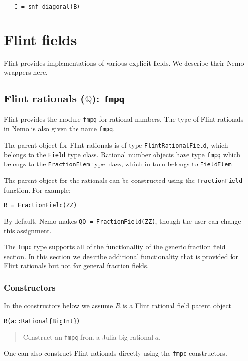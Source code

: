 \documentclass[a4paper,10pt]{article}
\newcommand{\Q}{\mathbb{Q}}
\newcommand{\code}{\lstinline}
\newcommand{\desc}[1]{\vspace{-3mm}\begin{quote}#1\end{quote}}
\begin{document}
{{\begin{lstlisting}
   C = snf_diagonal(B)
\end{lstlisting}

\section{Flint fields}

Flint provides implementations of various explicit fields. We describe their
Nemo wrappers here.

\subsection{Flint rationals ($\Q$): \code|fmpq|}

Flint provides the module \code{fmpq} for rational numbers. The type of Flint rationals
in Nemo is also given the name \code{fmpq}.

The parent object for Flint rationals is of type \code{FlintRationalField}, which
belongs to the \code{Field} type class. Rational number objects have type \code{fmpq}
which belongs to the \code{FractionElem} type class, which in turn belongs to 
\code{FieldElem}.

The parent object for the rationals can be constructed using the \code{FractionField}
function. For example:

\begin{lstlisting}
R = FractionField(ZZ)
\end{lstlisting}

By default, Nemo makes \code{QQ = FractionField(ZZ)}, though the user can change this
assignment.

The \code{fmpq} type supports all of the functionality of the generic fraction field
section. In this section we describe additional functionality that is provided for
Flint rationals but not for general fraction fields.

\subsubsection{Constructors}

In the constructors below we assume $R$ is a Flint rational field parent object.

\begin{lstlisting}
R(a::Rational{BigInt})
\end{lstlisting}

\desc{Construct an \code{fmpq} from a Julia big rational $a$.}

One can also construct Flint rationals directly using the \code{fmpq} constructors.

}}
\end{document}

